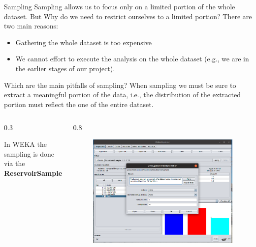 \documentclass{beamer}
\newcommand{\cols}[4]{
	\begin{columns}[t]
	\begin{column}{#1\textwidth}
		#3
	\end{column}
	\begin{column}{#2\textwidth}
		#4
	\end{column}
	\end{columns}
	
}
\begin{document}
\begin{frame}{Sampling}
Sampling allows us to focus only on a limited portion of the whole dataset.
\vskip 0.2cm
{\color{red} But Why do we need to restrict ourselves to a limited portion?}
\pause
There are two main reasons:
\begin{itemize}
\item Gathering the whole dataset is too expensive
\item We cannot effort to execute the analysis on the whole dataset (e.g.,
we are in the earlier stages of our project).
\end{itemize} 
\pause
{\color{red} Which are the main pitfalls of sampling?}
\pause
When sampling we must be sure to extract a meaningful portion of the
data, i.e., the distribution of the extracted portion must reflect the one of
the entire dataset.
\cols{0.3}{0.8}{

\vspace{3mm}
In WEKA the sampling is done via the \textbf{ReservoirSample}}
{
\begin{figure}[t]
\includegraphics[scale=0.1]{img/sampling.png}
\end{figure}
}
\end{frame}
\end{document}
